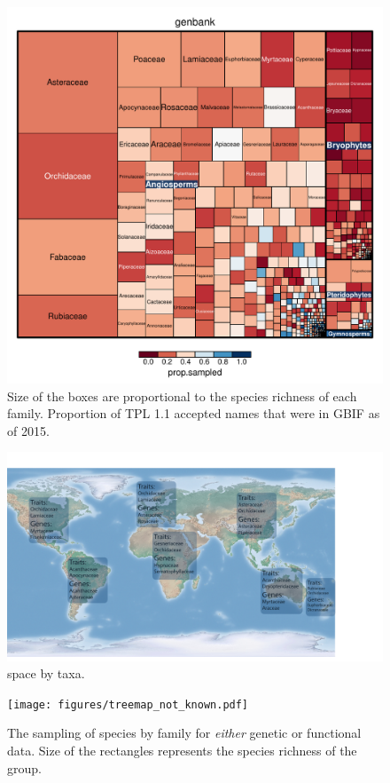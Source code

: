 \documentclass[a4paper,11pt]{article}
\begin{document}
\begin{figure}[h!]
\centering
\includegraphics[width=\textwidth]{figures/treemap_genbank.pdf}
\caption{Size of the boxes are proportional to the species richness of each family.  Proportion of TPL 1.1 accepted names that were in GBIF as of 2015.  }
\label{fig:genbank_treemap}
\end{figure}
\clearpage

\begin{figure}[h!]
\centering
\includegraphics[width=\textwidth]{figures/hyp.pdf}
\caption{ space by taxa.  }
\label{fig:hyp}
\end{figure}
\clearpage

\begin{figure}[h!]
\centering
\texttt{[image: figures/treemap\_not\_known.pdf]}
\caption{The sampling of species by family for \emph{either} genetic or functional data.  Size of the rectangles represents the species richness of the group. }
\label{fig:hyp}
\end{figure}
\clearpage


\end{document}
